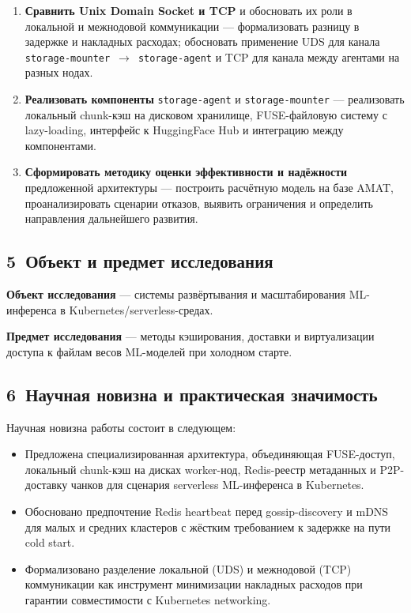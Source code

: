 \begin{enumerate}[leftmargin=*]
  \item \textbf{Сравнить Unix Domain Socket и TCP} и обосновать их роли в локальной и межнодовой коммуникации --- формализовать разницу в задержке и накладных расходах; обосновать применение UDS для канала \texttt{storage-mounter}~$\to$~\texttt{storage-agent} и TCP для канала между агентами на разных нодах.

  \item \textbf{Реализовать компоненты} \texttt{storage-agent} и \texttt{storage-mounter} --- реализовать локальный chunk-кэш на дисковом хранилище, FUSE-файловую систему с lazy-loading, интерфейс к HuggingFace Hub и интеграцию между компонентами.

  \item \textbf{Сформировать методику оценки эффективности и надёжности} предложенной архитектуры --- построить расчётную модель на базе AMAT, проанализировать сценарии отказов, выявить ограничения и определить направления дальнейшего развития.
\end{enumerate}

\subsection*{5~Объект и предмет исследования}

\textbf{Объект исследования} --- системы развёртывания и масштабирования ML-инференса в Kubernetes/serverless-средах.

\textbf{Предмет исследования} --- методы кэширования, доставки и виртуализации доступа к файлам весов ML-моделей при холодном старте.

\subsection*{6~Научная новизна и практическая значимость}

Научная новизна работы состоит в следующем:

\begin{itemize}[leftmargin=*]
  \item Предложена специализированная архитектура, объединяющая FUSE-доступ, локальный chunk-кэш на дисках worker-нод, Redis-реестр метаданных и P2P-доставку чанков для сценария serverless ML-инференса в Kubernetes.
  \item Обосновано предпочтение Redis heartbeat перед gossip-discovery и mDNS для малых и средних кластеров с жёстким требованием к задержке на пути cold start.
  \item Формализовано разделение локальной (UDS) и межнодовой (TCP) коммуникации как инструмент минимизации накладных расходов при гарантии совместимости с Kubernetes networking.
\end{itemize}

